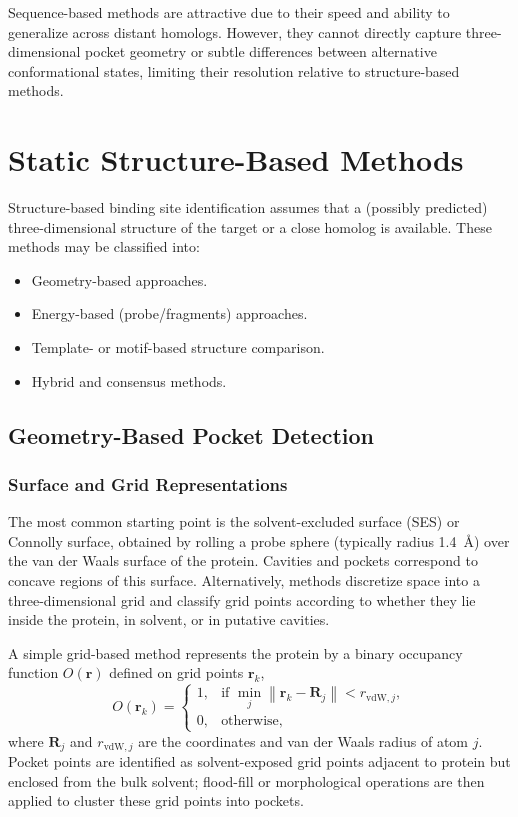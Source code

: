 \documentclass[12pt,a4paper]{article}
\begin{document}
Sequence-based methods are attractive due to their speed and ability to generalize across distant homologs. However, they cannot directly capture three-dimensional pocket geometry or subtle differences between alternative conformational states, limiting their resolution relative to structure-based methods.\cite{CH5_ghersi2011beyond,CH5_zhao2020exploring}

\section{Static Structure-Based Methods}

Structure-based binding site identification assumes that a (possibly predicted) three-dimensional structure of the target or a close homolog is available. These methods may be classified into:
\begin{itemize}
    \item Geometry-based approaches.
    \item Energy-based (probe/fragments) approaches.
    \item Template- or motif-based structure comparison.
    \item Hybrid and consensus methods.
\end{itemize}

\subsection{Geometry-Based Pocket Detection}

\subsubsection{Surface and Grid Representations}

The most common starting point is the solvent-excluded surface (SES) or Connolly surface, obtained by rolling a probe sphere (typically radius 1.4~\AA) over the van der Waals surface of the protein. Cavities and pockets correspond to concave regions of this surface. Alternatively, methods discretize space into a three-dimensional grid and classify grid points according to whether they lie inside the protein, in solvent, or in putative cavities.\cite{CH5_LeGuilloux2009,CH5_zhao2020exploring}

A simple grid-based method represents the protein by a binary occupancy function \(O(\mathbf{r})\) defined on grid points \(\mathbf{r}_k\),
\begin{equation}
O(\mathbf{r}_k) =
\begin{cases}
1, & \text{if } \min_j \left\| \mathbf{r}_k - \mathbf{R}_j \right\| < r_{\mathrm{vdW},j}, \\
0, & \text{otherwise},
\end{cases}
\label{eq:grid_occupancy}
\end{equation}
where \(\mathbf{R}_j\) and \(r_{\mathrm{vdW},j}\) are the coordinates and van der Waals radius of atom \(j\). Pocket points are identified as solvent-exposed grid points adjacent to protein but enclosed from the bulk solvent; flood-fill or morphological operations are then applied to cluster these grid points into pockets.\cite{CH5_Brylinski2008FINDSITE}
\end{document}
